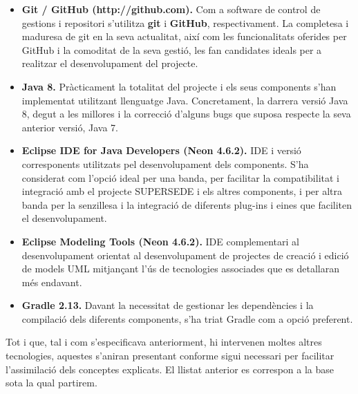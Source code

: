 \begin{itemize}
\item \textbf{Git / GitHub (http://github.com).} Com a software de control de gestions i repositori s'utilitza \textbf{git} i \textbf{GitHub}, respectivament. La completesa i maduresa de git en la seva actualitat, així com les funcionalitats oferides per GitHub i la comoditat de la seva gestió, les fan candidates ideals per a realitzar el desenvolupament del projecte.
\item \textbf{Java 8.} Pràcticament la totalitat del projecte i els seus components s'han implementat utilitzant llenguatge Java. Concretament, la darrera versió Java 8, degut a les millores i la correcció d'alguns bugs que suposa respecte la seva anterior versió, Java 7.
\item \textbf{Eclipse IDE for Java Developers (Neon 4.6.2).} IDE i versió corresponents utilitzats pel desenvolupament dels components. S'ha considerat com l'opció ideal per una banda, per facilitar la compatibilitat i integració amb el projecte SUPERSEDE i els altres components, i per altra banda per la senzillesa i la integració de diferents plug-ins i eines que faciliten el desenvolupament. 
\item \textbf{Eclipse Modeling Tools (Neon 4.6.2).}  IDE complementari al desenvolupament orientat al desenvolupament de projectes de creació i edició de models UML mitjançant l'ús de tecnologies associades que es detallaran més endavant. 
\item \textbf{Gradle 2.13.} Davant la necessitat de gestionar les dependències i la compilació dels diferents components, s'ha triat Gradle com a opció preferent.
\end{itemize}

Tot i que, tal i com s'especificava anteriorment, hi intervenen moltes altres tecnologies, aquestes s'aniran presentant conforme sigui necessari per facilitar l'assimilació dels conceptes explicats. El llistat anterior es correspon a la base sota la qual partirem.